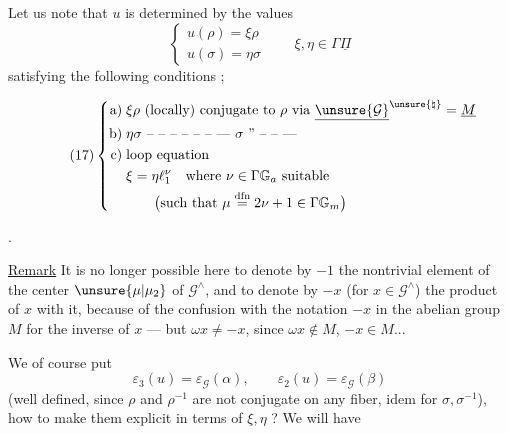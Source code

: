 
Let us note that $u$ is determined by the values
\[
\tag{16}
\begin{cases}
u(\rho)=\xi\rho\\
u(\sigma)=\eta\sigma
\end{cases}
\qquad\xi,\eta\in\Gamma\underline\Pi
\]
\inserted{$\xi,\eta$} satisfying the following conditions ;


\[
\tag{17}
\left\{
\begin{aligned}
\text{a)}\;&\xi\rho\ \text{(locally) conjugate to }\rho\ \text{via }\underline{\unsure{\mathcal G}}^{\unsure{\natural}}=\underline M\\
\text{b)}\;&\eta\sigma\ \text{-- -- -- -- -- -- ---}\ \sigma\ \text{'' -- -- ---}\\
\text{c)}\;&\text{loop equation}\\
&\xi=\eta\ell_1^{\nu}\quad\text{where }\nu\in\Gamma\mathbb G_a\ \text{suitable}\\
&\qquad\bigl(\text{such that }\mu\overset{\mathrm{dfn}}=2\nu+1\in\Gamma\mathbb G_m\bigr)
\end{aligned}\right.
\]

. 

\uline{Remark} It is no longer possible here to denote by $-1$ the nontrivial element \inserted{$\omega$} of the center $\unsure{\mu|\mu_2}$ of $\mathcal G^{\wedge}$, and to denote by $-x$ (for $x\in\mathcal G^{\wedge}$) the product of $x$ with it, because of the confusion with the notation $-x$  in the abelian group $M$ for the inverse of $x$ --- but  $\omega x\ne-x$, since $\omega x\notin M$, $-x\in M$...

We of course put
\[
\tag{18}
\varepsilon_3(u)=\varepsilon_{\mathcal G}(\alpha),\qquad
\varepsilon_2(u)=\varepsilon_{\mathcal G}(\beta)
\]
(well defined, since $\rho$ and $\rho^{-1}$ are not conjugate on any fiber, idem for $\sigma,\sigma^{-1}$), how to make them explicit in terms of $\xi,\eta$ ? We will have

